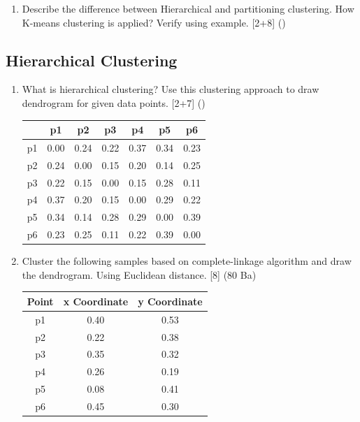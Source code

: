 \documentclass[12pt]{article}
\begin{document}
\begin{enumerate}[topsep=0pt, noitemsep]
      \item Describe the difference between Hierarchical and partitioning clustering. How K-means clustering is applied? Verify using example. \hfill [2+8] ()
    \end{enumerate}

  \subsection{Hierarchical Clustering}
    \begin{enumerate}[topsep=0pt, noitemsep]
      \item What is hierarchical clustering? Use this clustering approach to draw dendrogram for given data points. \hfill [2+7] ()\\
        \small
        \begin{tabular}{|c|c|c|c|c|c|c|}
          \hline
           & p1 & p2 & p3 & p4 & p5 & p6 \\ \hline
          p1 & 0.00 & 0.24 & 0.22 & 0.37 & 0.34 & 0.23 \\ \hline
          p2 & 0.24 & 0.00 & 0.15 & 0.20 & 0.14 & 0.25 \\ \hline
          p3 & 0.22 & 0.15 & 0.00 & 0.15 & 0.28 & 0.11 \\ \hline
          p4 & 0.37 & 0.20 & 0.15 & 0.00 & 0.29 & 0.22 \\ \hline
          p5 & 0.34 & 0.14 & 0.28 & 0.29 & 0.00 & 0.39 \\ \hline
          p6 & 0.23 & 0.25 & 0.11 & 0.22 & 0.39 & 0.00 \\ \hline
        \end{tabular}
        \normalsize

      \item Cluster the following samples based on complete-linkage algorithm and draw the dendrogram. Using Euclidean distance. \hfill [8] (80 Ba)\\
        \small
        \begin{tabular}{|c|c|c|}
          \hline
          Point & x Coordinate & y Coordinate \\ \hline
          p1 & 0.40 & 0.53 \\ \hline
          p2 & 0.22 & 0.38 \\ \hline
          p3 & 0.35 & 0.32 \\ \hline
          p4 & 0.26 & 0.19 \\ \hline
          p5 & 0.08 & 0.41 \\ \hline
          p6 & 0.45 & 0.30 \\ \hline
        \end{tabular}
        \normalsize


\end{enumerate}
\end{document}
